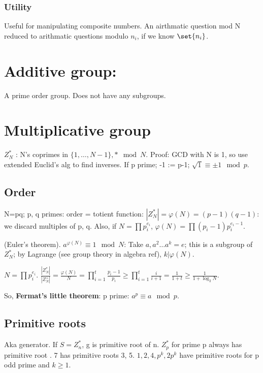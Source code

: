 \documentclass[10pt]{amsart}
\begin{document}
\subsubsection{Utility}
Useful for manipulating composite numbers. An airthmatic question mod N reduced to arithmatic questions modulo $n_{i}$, if we know $\set{n_{i}}$.

\section{Additive group: }
A prime order group. Does not have any subgroups.

\section{Multiplicative group }
$Z^{*}_{N}$ : N's coprimes in $\{1, \dots, N-1\}, * \mod N$. Proof: GCD with N is 1, so use extended Euclid's alg to find inverses. If p prime; -1 := p-1; $\sqrt{1} \equiv \pm 1 \mod p$.

\subsection{Order}
N=pq; p, q primes: order = totient function: $|Z^{*}_{N}|=\varphi(N)=(p-1)(q-1)$: we discard multiples of p, q. Also, if $N= \prod p_{i}^{e_{i}}$, $\varphi(N)=\prod (p_{i}-1)p_{i}^{e_{i}-1}$.

(Euler's theorem). $a^{\varphi(N)} \equiv 1 \mod N$: Take $a, a^{2} \dots a^{k} = e$; this is a subgroup of $Z^{*}_{N}$; by Lagrange (see group theory in algebra ref), $k|\varphi(N)$.

$N= \prod p_{i}^{e_{i}}$. $\frac{|Z_{N}^{*}|}{|Z_{N}^{+}|} = \frac{\varphi(N)}{N} = \prod_{i = 1}^{t}\frac{p_{i} - 1}{p_{i}} \geq \prod_{i = 1}^{t}\frac{i}{i+1} = \frac{1}{1 + t} \geq \frac{1}{1 + \log_{2}N}$.

So, \textbf{Fermat's little theorem}: p prime: $a^{p} \equiv a \mod p$.

\subsection{Primitive roots}
Aka generator. If $S = Z_{n}^{*}$, g is primitive root of n. $Z_{p}^{*}$ for prime p always has primitive root \why. 7 has primitive roots 3, 5. $1,2,4,p^{k},2p^{k}$ have primitive roots for p odd prime and $k \geq 1$.\\
\why \tbc
\end{document}
